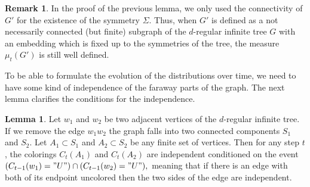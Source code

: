 \documentclass{article}
\theoremstyle{definition}
\newtheorem{lemma}[definition]{Lemma}
\newtheorem{remark}[definition]{Remark}
\begin{document}
\begin{remark}\label{remark:marginal}
 In the proof of the previous lemma, we only used the connectivity of $G'$ for the existence of the symmetry $\Sigma$. Thus, when $G'$ is defined as a not necessarily connected (but finite) subgraph of the $d$-regular infinite tree $G$ with an embedding which is fixed up to the symmetries of the tree, the measure $\mu_t(G')$ is still well defined.
\end{remark}

To be able to formulate the evolution of the distributions over time, we need to have some kind of independence of the faraway parts of the graph. The next lemma clarifies the conditions for the independence.

\begin{lemma}
\label{lemma:condindep}
 Let $w_1$ and $w_2$ be two adjacent vertices of the $d$-regular infinite tree. If we remove the edge $w_1w_2$ the graph falls into two connected components $S_1$ and $S_2$. Let $A_1\subset S_1$ and $A_2\subset S_2$ be any finite set of vertices. Then for any step $t$, the colorings $C_t(A_1)$ and $C_t(A_2)$ are independent conditioned on the event $(C_{t-1}(w_1)="U")\cap(C_{t-1}(w_2)="U"),$ meaning that if there is an edge with both of its endpoint uncolored then the two sides of the edge are independent.
\end{lemma}
\end{document}
